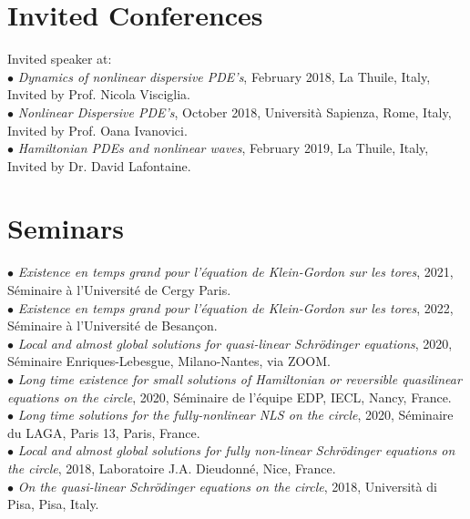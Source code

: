\documentclass[margin,line,pifont,palatino,courier]{res}
\begin{document}
\begin{resume}
\section{\sc Invited Conferences}

Invited speaker at:\\
 $\bullet$ \emph{Dynamics of nonlinear dispersive PDE's}, February 2018, La Thuile, Italy, Invited by Prof. Nicola Visciglia.\\
$\bullet$  \emph{Nonlinear Dispersive PDE's}, October 2018, Universit\`a Sapienza, Rome, Italy, Invited by Prof. Oana Ivanovici.\\
  $\bullet$ \emph{Hamiltonian PDEs and nonlinear waves}, February 2019, La Thuile, Italy, Invited by Dr. David Lafontaine.\\



\section{\sc Seminars}
$\bullet$ \emph{Existence en temps grand pour l'\'equation de Klein-Gordon sur les tores}, 2021, S\'eminaire \`a l'Universit\'e de Cergy Paris.\\
$\bullet$ \emph{Existence en temps grand pour l'\'equation de Klein-Gordon sur les tores}, 2022, S\'eminaire \`a l'Universit\'e de Besan\c{c}on.\\
$\bullet$ \emph{Local and almost global solutions for quasi-linear Schr\"odinger equations}, 2020, S\'eminaire Enriques-Lebesgue, Milano-Nantes, via ZOOM. \\
$\bullet$ \emph{Long time existence for small solutions of Hamiltonian or reversible quasilinear equations on the circle}, 2020, S\'eminaire de l'\'equipe EDP, IECL, Nancy, France.\\
$\bullet$ \emph{Long time solutions for the fully-nonlinear NLS on the circle}, 2020, S\'eminaire du LAGA,  Paris 13, Paris, France.\\
$\bullet$ \emph{Local and almost global solutions for fully non-linear Schr\"odinger equations on the circle}, 2018, Laboratoire  J.A. Dieudonn\'e, Nice, France.\\
$\bullet$ \emph{On the quasi-linear Schr\"odinger equations on the circle}, 2018, Universit\`a di Pisa, Pisa, Italy.\\


\end{resume}
\end{document}
